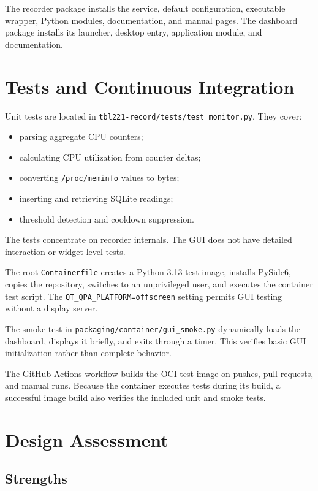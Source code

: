 \documentclass[11pt,a4paper]{article}
\begin{document}
The recorder package installs the service, default configuration, executable wrapper, Python modules, documentation, and manual pages. The dashboard package installs its launcher, desktop entry, application module, and documentation.

\section{Tests and Continuous Integration}

Unit tests are located in \texttt{tbl221-record/tests/test\_monitor.py}. They cover:

\begin{itemize}
  \item parsing aggregate CPU counters;
  \item calculating CPU utilization from counter deltas;
  \item converting \texttt{/proc/meminfo} values to bytes;
  \item inserting and retrieving SQLite readings;
  \item threshold detection and cooldown suppression.
\end{itemize}

The tests concentrate on recorder internals. The GUI does not have detailed interaction or widget-level tests.

The root \texttt{Containerfile} creates a Python 3.13 test image, installs PySide6, copies the repository, switches to an unprivileged user, and executes the container test script. The \texttt{QT\_QPA\_PLATFORM=offscreen} setting permits GUI testing without a display server.

The smoke test in \texttt{packaging/container/gui\_smoke.py} dynamically loads the dashboard, displays it briefly, and exits through a timer. This verifies basic GUI initialization rather than complete behavior.

The GitHub Actions workflow builds the OCI test image on pushes, pull requests, and manual runs. Because the container executes tests during its build, a successful image build also verifies the included unit and smoke tests.

\section{Design Assessment}

\subsection{Strengths}
\end{document}
